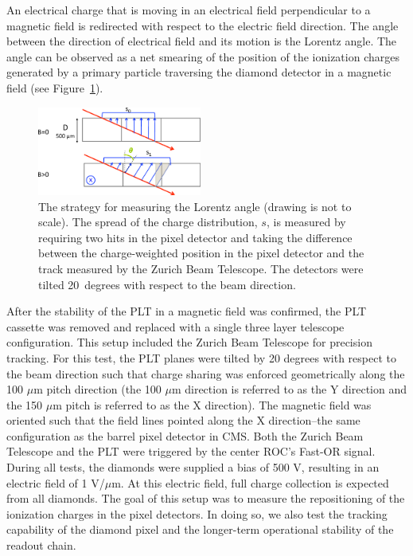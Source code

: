 \documentclass[journal]{IEEEtran}
\begin{document}
An electrical charge that is moving in an 
electrical field perpendicular to a magnetic 
field is redirected with respect to the 
electric field direction. The angle between
the direction of electrical field and its
motion is the Lorentz angle.
The angle can be observed as a net smearing
of the position of the ionization charges generated
by a primary particle traversing the diamond detector
in a magnetic field (see Figure~\ref{fig:lorentz_measurement}).

\begin{figure}[!h]
\centering
\includegraphics[width=0.48\textwidth]{lorentz_measurement}
\caption{ The strategy for measuring the Lorentz angle (drawing is not to scale).  The spread of the charge distribution, $s$, is measured by requiring two hits in the pixel detector and taking the difference between the charge-weighted position in the pixel detector and the track measured by the Zurich Beam Telescope.  The detectors were tilted 20~degrees with respect to the beam direction. }
\label{fig:lorentz_measurement}
\end{figure}

After the stability of the PLT in a magnetic field was confirmed, the PLT cassette was removed and replaced with a single three layer telescope configuration.  This setup included the Zurich Beam Telescope for precision tracking. For this test, the PLT planes were tilted by 20 degrees with respect to the beam direction such that charge sharing was enforced geometrically along the 100 $\mu$m pitch direction (the 100 $\mu$m direction is referred to as the Y direction and the 150 $\mu$m pitch is referred to as the X direction).  The magnetic field was oriented such that the field lines pointed along the X direction--the same configuration as the barrel pixel detector in CMS.
Both the Zurich Beam Telescope and the PLT were triggered by the center ROC's Fast-OR signal. During all tests, the diamonds were supplied a bias of 500 V, resulting in an electric field of 1 V/$\mu$m.  At this electric field, full charge collection is expected from all diamonds.
The goal of this setup was to measure the repositioning of the ionization charges in the pixel detectors.   In doing so, we also test the tracking capability of
the diamond pixel and the longer-term operational stability of
the readout chain.
\end{document}
